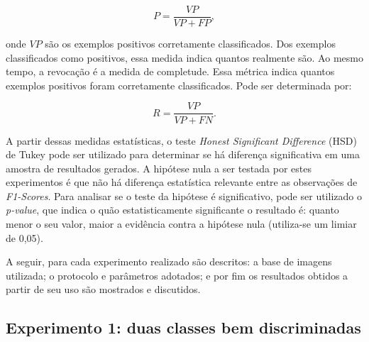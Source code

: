 \begin{equation*}
  P = \frac{VP}{VP + FP},
\end{equation*}

\noindent onde $VP$ são os exemplos positivos corretamente classificados. Dos exemplos classificados como positivos, essa medida indica quantos realmente são. Ao mesmo tempo, a revocação é a medida de completude. Essa métrica indica quantos exemplos positivos foram corretamente classificados. Pode ser determinada por:

\begin{equation*}
  R = \frac{VP}{VP + FN}.
\end{equation*}

A partir dessas medidas estatísticas, o teste \textit{Honest Significant Difference} (HSD) de Tukey pode ser utilizado para determinar se há diferença significativa em uma amostra de resultados gerados. A hipótese nula a ser testada por estes experimentos é que não há diferença estatística relevante entre as observações de \textit{F1-Scores}. Para analisar se o teste da hipótese é significativo, pode ser utilizado o \textit{p-value}, que indica o quão estatisticamente significante o resultado é: quanto menor o seu valor, maior a evidência contra a hipótese nula (utiliza-se um limiar de 0,05).


A seguir, para cada experimento realizado são descritos: a base de imagens utilizada; o protocolo e parâmetros adotados; e por fim os resultados obtidos a partir de seu uso são mostrados e discutidos.

\FloatBarrier
\subsection{Experimento 1: duas classes bem discriminadas}

